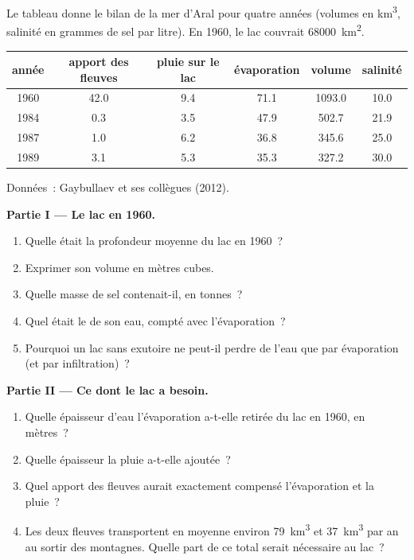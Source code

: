 \begin{problem}
\label{pb:g10:freshwater-resources:1}
Le tableau donne le bilan de la mer d'Aral pour quatre années (volumes en
\unit{km^3}, salinité en grammes de sel par litre). En 1960, le lac
couvrait \qty{68000}{km^2}.
\begin{center}
\small
\begin{tabular}{|c|c|c|c|c|c|}
\hline
année & apport des fleuves & pluie sur le lac & évaporation & volume & salinité \\ \hline
1960 & 42.0 & 9.4 & 71.1 & 1093.0 & 10.0 \\ \hline
1984 & 0.3 & 3.5 & 47.9 & 502.7 & 21.9 \\ \hline
1987 & 1.0 & 6.2 & 36.8 & 345.6 & 25.0 \\ \hline
1989 & 3.1 & 5.3 & 35.3 & 327.2 & 30.0 \\ \hline
\end{tabular}

{\small Données~: Gaybullaev et ses collègues (2012).}
\end{center}

\medskip
\noindent\textbf{Partie I --- Le lac en 1960.}
\begin{enumerate}
  \item Quelle était la profondeur moyenne du lac en 1960~?
  \item Exprimer son volume en mètres cubes.
  \item Quelle masse de sel contenait-il, en tonnes~?
  \item Quel était le  de son eau, compté avec
        l'évaporation~?
  \item Pourquoi un lac sans exutoire ne peut-il perdre de l'eau que par
        évaporation (et par infiltration)~?
\end{enumerate}

\medskip
\noindent\textbf{Partie II --- Ce dont le lac a besoin.}
\begin{enumerate}[resume]
  \item Quelle épaisseur d'eau l'évaporation a-t-elle retirée du lac en
        1960, en mètres~?
  \item Quelle épaisseur la pluie a-t-elle ajoutée~?
  \item Quel apport des fleuves aurait exactement compensé l'évaporation
        et la pluie~?
  \item Les deux fleuves transportent en moyenne environ \qty{79}{km^3} et
        \qty{37}{km^3} par an au sortir des montagnes. Quelle part de ce
        total serait nécessaire au lac~?
\end{enumerate}


\end{problem}
